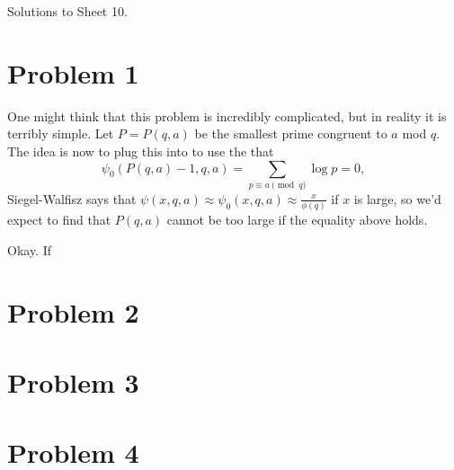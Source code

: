\documentclass[a4paper,11pt]{article}
\author{Max von Consbruch}
\begin{document}
\begin{center}
    \huge{Solutions to Sheet 10.}
\end{center}

\section*{Problem 1}
One might think that this problem is incredibly complicated, but in reality it 
is terribly simple. Let $P = P(q,a)$ be the smallest prime congruent to $a$ mod $q$.
The idea is now to plug this into to use the that 
\[
    \psi_0(P(q,a)-1,q,a) = \sum_{p \equiv a \pmod q} \log p = 0,
\]
Siegel-Walfisz says that $\psi(x,q,a) \approx \psi_0(x,q,a) \approx \frac
x{\phi(q)}$ if $x$ is large, so we'd expect to find that $P(q,a)$ cannot be too
large if the equality above holds.

Okay. If 

\section*{Problem 2}
\section*{Problem 3}
\section*{Problem 4}
\contactend
\end{document}
